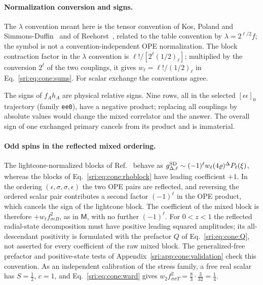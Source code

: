\paragraph{Normalization conversion and signs.} The $\lambda$ convention meant here is the tensor convention of
Kos, Poland and Simmons-Duffin~\cite{sri:Kos:2014bka} and of Reehorst~\cite{sri:Reehorst:2021}, related to the table convention by $\lambda=2^{\ell/2}f$; the symbol is
not a convention-independent OPE normalization. The block contraction factor in the $\lambda$ convention is
$\ell!/[2^\ell(1/2)_\ell]$; multiplied by the conversion $2^\ell$ of the two couplings, it gives $w_\ell=\ell!/(1/2)_\ell$
in Eq.~\eqref{sri:eq:cone:sums}. For scalar exchange the conventions agree.

The signs of $f_Ah_A$ are physical relative signs. Nine rows, all in the selected $[\epsilon\epsilon]_0$ trajectory
(family \texttt{ee0}), have a negative product; replacing all couplings by absolute values would change the mixed
correlator and the answer. The overall sign of one exchanged primary cancels from its product and is immaterial.

\paragraph{Odd spins in the reflected mixed ordering.} The lightcone-normalized blocks of
Ref.~\cite{sri:Simmons-Duffin:2016wlq} behave as $g^{\rm SD}_{\Delta,\ell}\sim(-1)^\ell w_\ell(4\varrho)^\Delta P_\ell(\xi)$,
whereas the blocks of Eq.~\eqref{sri:eq:cone:rhoblock} have leading coefficient $+1$. In the ordering
$(\epsilon,\sigma,\sigma,\epsilon)$ the two OPE pairs are reflected, and reversing the ordered scalar pair contributes a
second factor $(-1)^\ell$ in the OPE product, which cancels the sign of the lightcone block. The coefficient of the
mixed block is therefore $+w_\ell f_{\sigma\epsilon B}^2$, as in $\mathsf M$, with no further $(-1)^\ell$. For
$0<z<1$ the reflected radial-state decomposition must have positive leading squared amplitudes; its all-descendant
positivity is formulated with the prefactor $Q$ of Eq.~\eqref{sri:eq:cone:Q}, not asserted for every coefficient of the
raw mixed block. The generalized-free prefactor and positive-state tests of Appendix~\ref{sri:app:cone:validation} check this
convention. As an independent calibration of the stress family, a free real scalar has $S=\frac12$, $c=1$, and
Eq.~\eqref{sri:eq:cone:ward} gives $w_2f_{\sigma\sigma T}^2=\frac83\cdot\frac3{32}=\frac14$.

